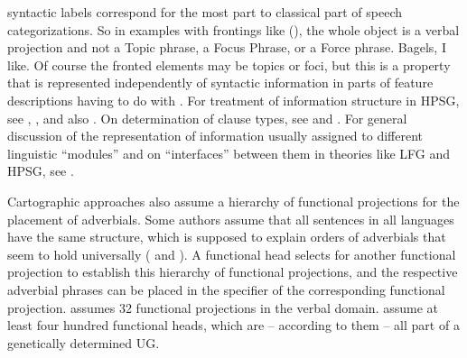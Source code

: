 \documentclass[output=paper
                ,modfonts
                ,nonflat
	        ,collection
	        ,collectionchapter
	        ,collectiontoclongg
 	        ,biblatex
                ,babelshorthands
                ,newtxmath
                ,draftmode
                ,colorlinks, citecolor=brown
]{./langsci/langscibook}
\begin{document}
syntactic labels correspond for the most part to classical part of speech categorizations. So in examples with
frontings like (), the whole object is a verbal projection and not a Topic phrase, a Focus
Phrase, or a Force phrase.
\ea
Bagels, I like.
\z
Of course the fronted elements may be topics or foci, but this is a property that is represented
independently of syntactic information in parts of feature descriptions having to do with
. For treatment of information structure in HPSG, see
, , and also . On determination of clause types, see
 and . For general discussion of the representation of
information usually assigned to different linguistic ``modules'' and on ``interfaces''
between them in theories like LFG and HPSG, see .

Cartographic approaches also assume a hierarchy of functional projections for the placement of
adverbials. Some authors assume that all sentences in all languages have the same structure, which is supposed
to explain orders of adverbials that seem to hold universally (\eg \citealp[]{Cinque99a-u}
and \citealp[--55]{CR2010a}). A functional head selects for another functional
projection to establish this hierarchy of functional projections, and the respective adverbial
phrases can be placed in the specifier of the corresponding functional projection. \citet[]{Cinque99a-u} assumes 32 functional projections in the verbal domain. \citet[, 65]{CR2010a} assume at least four hundred functional heads, which are -- according to them -- all
part of a genetically determined UG.
\end{document}
